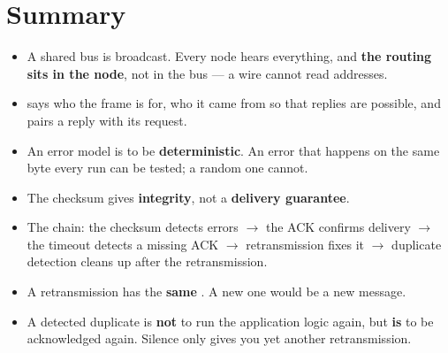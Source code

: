 \section*{Summary}

\begin{itemize}
  \item A shared bus is broadcast. Every node hears everything, and \textbf{the routing sits in
    the node}, not in the bus --- a wire cannot read addresses.
  \item {} says who the frame is for,  who it came from so that replies are
    possible, and  pairs a reply with its request.
  \item An error model is to be \textbf{deterministic}. An error that happens on the same byte
    every run can be tested; a random one cannot.
  \item The checksum gives \textbf{integrity}, not a \textbf{delivery guarantee}.
  \item The chain: the checksum detects errors $\rightarrow$ the ACK confirms delivery
    $\rightarrow$ the timeout detects a missing ACK $\rightarrow$ retransmission fixes it
    $\rightarrow$ duplicate detection cleans up after the retransmission.
  \item A retransmission has the \textbf{same} . A new one would be a new message.
  \item A detected duplicate is \textbf{not} to run the application logic again, but
    \textbf{is} to be acknowledged again. Silence only gives you yet another retransmission.
\end{itemize}
